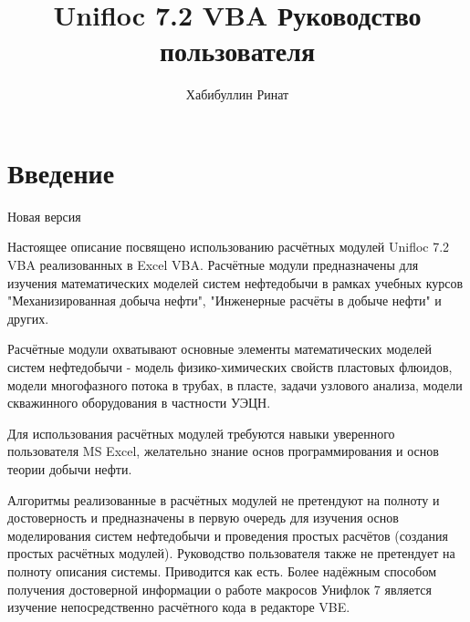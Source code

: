 \documentclass[]{scrreprt}
\begin{document}
\newcommand{\unf}{Unifloc 7.2 VBA }

\newcommand{\putlisting}[1]{
	\tcbinputlisting{
		listing file=#1,
		minted language=vb.net,
		minted options={breaklines,fontsize=\small},%
		breakable,enhanced,%
		listing only
		}
}



\title{\unf Руководство пользователя}
\author{Хабибуллин Ринат}

\maketitle

\tableofcontents

\chapter{Введение}
Новая версия

Настоящее описание посвящено использованию расчётных модулей \unf реализованных в Excel VBA. Расчётные модули предназначены для изучения математических моделей систем нефтедобычи в рамках учебных курсов "Механизированная добыча нефти", "Инженерные расчёты в добыче нефти" и других.

Расчётные модули охватывают основные элементы математических моделей систем нефтедобычи - модель физико-химических свойств пластовых флюидов, модели многофазного потока в трубах, в пласте, задачи узлового анализа, модели скважинного оборудования в частности УЭЦН.  

Для использования расчётных модулей требуются навыки уверенного пользователя MS Excel, желательно знание основ программирования и основ теории добычи нефти. 

Алгоритмы реализованные в расчётных модулей не претендуют на полноту и достоверность и предназначены в первую очередь для изучения основ моделирования систем нефтедобычи и проведения простых расчётов (создания простых расчётных модулей). Руководство пользователя также не претендует на полноту описания системы. Приводится как есть. Более надёжным способом получения достоверной информации о работе макросов Унифлок 7 является изучение непосредственно расчётного кода в редакторе VBE.
\end{document}
